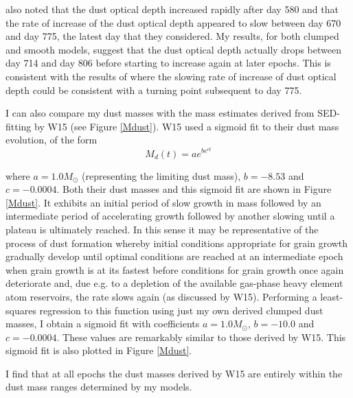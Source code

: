 \citet{Lucy1989} also noted that the dust optical depth increased rapidly 
after day 580 and that the rate of increase of the dust optical depth 
appeared to slow between day 670 and day 775, the latest day that they 
considered.  My results, for both clumped and smooth models, suggest that 
the dust optical depth actually drops between day 714 and day 806 before 
starting to increase again at later epochs.  This is consistent with the 
results of \citet{Lucy1989} where the slowing rate of increase of dust 
optical depth could be consistent with a turning point subsequent to day 
775.

I can also compare my dust masses with the mass estimates derived from 
SED-fitting by W15 (see Figure \ref{Mdust}).  W15 used a sigmoid fit to 
their dust mass evolution, of the form
\begin{equation}
M_d(t)=ae^{be^{ct}}
\end{equation}
 
\noindent where $a=1.0M_{\odot}$ (representing the limiting dust mass), 
$b=-8.53$ and $c=-0.0004$.  Both their dust masses and this sigmoid fit 
are shown in Figure \ref{Mdust}.  It exhibits an initial period of slow 
growth in mass followed by an intermediate period of accelerating growth 
followed by another slowing until a plateau is ultimately reached.  In 
this sense it may be representative of the process of dust 
formation whereby initial conditions appropriate for grain growth 
gradually develop until optimal conditions are reached at an intermediate 
epoch when grain growth is at its fastest before conditions for grain growth once again 
deteriorate and, due e.g. to a depletion of the available gas-phase heavy element atom reservoirs, the rate slows again (as discussed by W15).  Performing a 
least-squares regression to this function using just my own derived 
clumped dust masses, I obtain a sigmoid fit with coefficients 
$a=1.0M_{\odot}$, $b=-10.0$ and $c=-0.0004$.  These values are 
remarkably similar to those derived by W15.  This sigmoid fit is also 
plotted in Figure \ref{Mdust}.

I find that at all epochs the dust masses derived by W15 are entirely 
within the dust mass ranges determined by my models.

